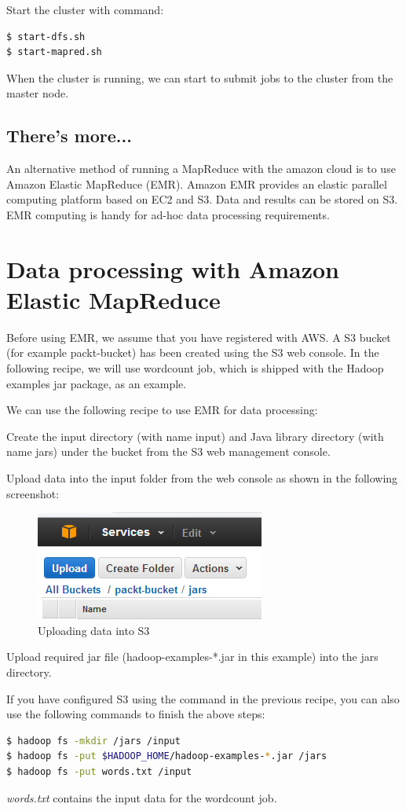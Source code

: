 Start the cluster with command:
\lstset{style=bashstyle}
\begin{lstlisting}[language=bash]
$ start-dfs.sh
$ start-mapred.sh
\end{lstlisting}

When the cluster is running, we can start to submit jobs to the cluster from the master node.
\subsection*{There's more...}
An alternative method of running a MapReduce with the amazon cloud is to use Amazon Elastic MapReduce (EMR). Amazon EMR provides an elastic parallel computing platform based on EC2 and S3. Data and results can be stored on S3. EMR computing is handy for ad-hoc data processing requirements.

\section{Data processing with Amazon Elastic MapReduce}
Before using EMR, we assume that you have registered with AWS. A S3 bucket (for example packt-bucket) has been created using the S3 web console. In the following recipe, we will use wordcount job, which is shipped with the Hadoop examples jar package, as an example.

We can use the following recipe to use EMR for data processing:

Create the input directory (with name input) and Java library directory (with name jars) under the bucket from the S3 web management console.

Upload data into the input folder from the web console as shown in the following screenshot:
\begin{figure}[ht]
  \centering
  \includegraphics[width=.4\textwidth]{figs/5163os_08_22.png}
  \caption{Uploading data into S3}\label{fig:aws.s3.upload}
\end{figure} 
Upload required jar file (hadoop-examples-*.jar in this example) into the jars directory.

If you have configured S3 using the command in the previous recipe, you can also use the following commands to finish the above steps:
\lstset{style=bashstyle}
\begin{lstlisting}[language=bash]
$ hadoop fs -mkdir /jars /input
$ hadoop fs -put $HADOOP_HOME/hadoop-examples-*.jar /jars
$ hadoop fs -put words.txt /input
\end{lstlisting}
\emph{words.txt} contains the input data for the wordcount job.

